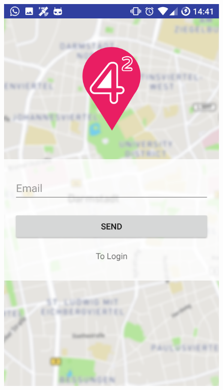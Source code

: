 \documentclass[11pt, accentcolor=tud1c]{tudreport}
\begin{document}
\begin{figure}[h]
\begin{minipage}{.3\textwidth}
  \includegraphics[width=.8\linewidth]{./res/forgotPW.png}
  \label{fig:forgot_pw_view}
\end{minipage}%
\end{figure}
\end{document}

